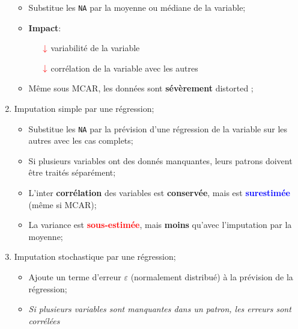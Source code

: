 \documentclass[10pt, french]{article}
\begin{document}
\begin{multicols*}{3}
\begin{enumerate}
		\begin{itemize}
		\item	Substitue les \texttt{NA} par la moyenne ou médiane de la variable;
		\item	\textbf{Impact}:
			\begin{itemize}
			\item[$\color{red}\downarrow$]	variabilité de la variable	\\
			\item[$\color{red}\downarrow$]	corrélation de la variable avec les autres	\\
			\end{itemize}
		\item	Même sous MCAR, les données sont \textbf{sévèrement} \og distorted \fg{};
		\end{itemize}
	\item	Imputation simple par une régression;
		\begin{itemize}
		\item	Substitue les \texttt{NA} par la prévision d'une régression de la variable sur les autres avec les cas complets;
		\item	Si plusieurs variables ont des donnés manquantes, leurs patrons doivent être traités séparément;
		\item	L'inter \textbf{corrélation} des variables est \textbf{conservée}, mais est \textcolor{blue}{\textbf{surestimée}} (même si MCAR);
		\item	La variance est \textcolor{red}{\textbf{sous-estimée}}, mais \textbf{moins} qu'avec l'imputation par la moyenne;
		\end{itemize}
	\item	Imputation stochastique par une régression;
		\begin{itemize}
		\item	Ajoute un terme d'erreur $\varepsilon$ (normalement distribué) à la prévision de la régression;
		\item	\textit{Si plusieurs variables sont manquantes dans un patron, les erreurs sont corrélées}

\end{itemize}
\end{enumerate}
\end{multicols*}
\end{document}
